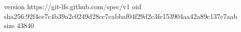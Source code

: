 version https://git-lfs.github.com/spec/v1
oid sha256:92f4ce7c4b39a2c0249d28cc7cabbaf04f29d2c3fe153904aa42a89c137c7aab
size 43840
